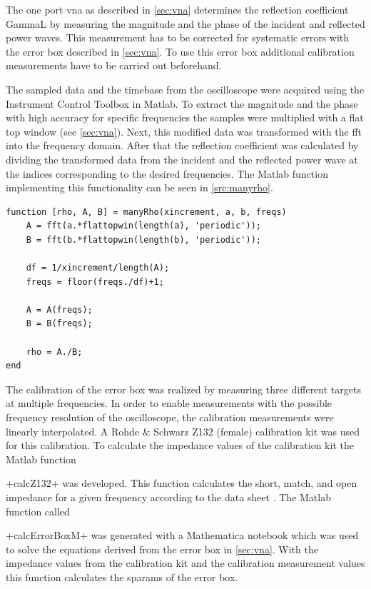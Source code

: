 \documentclass[12pt,a4paper,parskip=full,abstract=true,BCOR=12mm]{scrreprt}
\newcommand{\hack}{}
\newcommand*{\SavedLstInline}{}
\DeclareRobustCommand*{\lstinline}{%
  \ifmmode
    \let\SavedBGroup\bgroup
    \def\bgroup{%
      \let\bgroup\SavedBGroup
      \hbox\bgroup
    }%
  \fi
  \SavedLstInline
}
\begin{document}
The one port \gls{vna} as described in \cref{sec:vna} determines the reflection
coefficient \gls{GammaL} by measuring the magnitude and the phase of the incident
and reflected power waves. This measurement has to be corrected for systematic
errors with the error box described in \cref{sec:vna}. To use
this error box additional calibration measurements have to be carried out
beforehand.

The sampled data and the timebase from the oscilloscope were acquired using the
Instrument Control Toolbox in Matlab. To extract the magnitude and the phase
with high accuracy for specific frequencies the samples were multiplied with
a flat top window (see \cref{sec:vna}). Next, this modified data was transformed
with the \gls{fft} into the frequency domain. After that the reflection coefficient
was calculated by dividing the transformed data from the incident and the reflected
power wave at the indices corresponding to the desired frequencies. The Matlab
function implementing this functionality can be seen in \cref{src:manyrho}.

\begin{lstlisting}[float=htb,caption={Function for calculating $\frac{\gls{a}}{\gls{b}}$ from sampled data at multiple frequencies},label=src:manyrho,basicstyle=\hack\scriptsize]
function [rho, A, B] = manyRho(xincrement, a, b, freqs)
    A = fft(a.*flattopwin(length(a), 'periodic'));
    B = fft(b.*flattopwin(length(b), 'periodic'));

    df = 1/xincrement/length(A);
    freqs = floor(freqs./df)+1;

    A = A(freqs);
    B = B(freqs);

    rho = A./B;
end
\end{lstlisting}

The calibration of the error box was realized by measuring three different targets
at multiple frequencies. In order to enable measurements with the possible
frequency resolution of the oscilloscope, the calibration measurements were
linearly interpolated. A Rohde \& Schwarz Z132 (female) calibration kit was used
for this calibration. To calculate the impedance values of the
calibration kit the Matlab function \lstinline+calcZ132+ was developed. This function
calculates the short, match, and open impedance for a given frequency according to
the data sheet \cite{zv-z132}. The Matlab function called \lstinline+calcErrorBoxM+ was
generated with a Mathematica notebook which was used to solve the equations
derived from the error box in \cref{sec:vna}. With the impedance values from
the calibration kit and the calibration measurement values this function calculates
the \glspl{sparam} of the error box.
\end{document}
